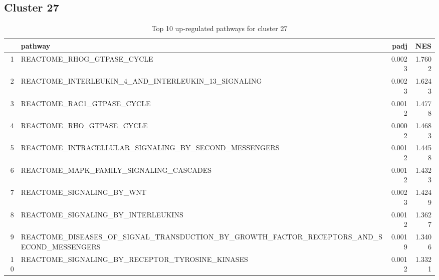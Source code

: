 \documentclass{article}
\begin{document}
\subsection{Cluster 27 }
\begin{table}[H]
\centering
\begin{tabularx}{\textwidth}{rlrr}
  \hline
 & pathway & padj & NES \\ 
  \hline
1 & REACTOME\_RHOG\_GTPASE\_CYCLE & 0.0023 & 1.7602 \\ 
  2 & REACTOME\_INTERLEUKIN\_4\_AND\_INTERLEUKIN\_13\_SIGNALING & 0.0023 & 1.6243 \\ 
  3 & REACTOME\_RAC1\_GTPASE\_CYCLE & 0.0012 & 1.4778 \\ 
  4 & REACTOME\_RHO\_GTPASE\_CYCLE & 0.0002 & 1.4683 \\ 
  5 & REACTOME\_INTRACELLULAR\_SIGNALING\_BY\_SECOND\_MESSENGERS & 0.0012 & 1.4458 \\ 
  6 & REACTOME\_MAPK\_FAMILY\_SIGNALING\_CASCADES & 0.0012 & 1.4323 \\ 
  7 & REACTOME\_SIGNALING\_BY\_WNT & 0.0023 & 1.4249 \\ 
  8 & REACTOME\_SIGNALING\_BY\_INTERLEUKINS & 0.0012 & 1.3627 \\ 
  9 & REACTOME\_DISEASES\_OF\_SIGNAL\_TRANSDUCTION\_BY\_GROWTH\_FACTOR\_RECEPTORS\_AND\_SECOND\_MESSENGERS & 0.0019 & 1.3406 \\ 
  10 & REACTOME\_SIGNALING\_BY\_RECEPTOR\_TYROSINE\_KINASES & 0.0012 & 1.3321 \\ 
   \hline
\end{tabularx}
\caption{Top 10 up-regulated pathways for cluster 27} 
\label{tab:q3_2_27}
\end{table}
\end{document}
